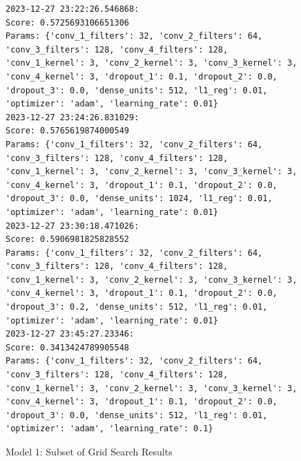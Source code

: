 

\setcounter{figure}{0}
\setcounter{table}{0} 
\begin{figure}[H]
\begin{verbatim}
2023-12-27 23:22:26.546868:
Score: 0.5725693106651306
Params: {'conv_1_filters': 32, 'conv_2_filters': 64, 'conv_3_filters': 128, 'conv_4_filters': 128, 'conv_1_kernel': 3, 'conv_2_kernel': 3, 'conv_3_kernel': 3, 'conv_4_kernel': 3, 'dropout_1': 0.1, 'dropout_2': 0.0, 'dropout_3': 0.0, 'dense_units': 512, 'l1_reg': 0.01, 'optimizer': 'adam', 'learning_rate': 0.01}
2023-12-27 23:24:26.831029:
Score: 0.5765619874000549
Params: {'conv_1_filters': 32, 'conv_2_filters': 64, 'conv_3_filters': 128, 'conv_4_filters': 128, 'conv_1_kernel': 3, 'conv_2_kernel': 3, 'conv_3_kernel': 3, 'conv_4_kernel': 3, 'dropout_1': 0.1, 'dropout_2': 0.0, 'dropout_3': 0.0, 'dense_units': 1024, 'l1_reg': 0.01, 'optimizer': 'adam', 'learning_rate': 0.01}
2023-12-27 23:30:18.471026:
Score: 0.5906981825828552
Params: {'conv_1_filters': 32, 'conv_2_filters': 64, 'conv_3_filters': 128, 'conv_4_filters': 128, 'conv_1_kernel': 3, 'conv_2_kernel': 3, 'conv_3_kernel': 3, 'conv_4_kernel': 3, 'dropout_1': 0.1, 'dropout_2': 0.0, 'dropout_3': 0.2, 'dense_units': 512, 'l1_reg': 0.01, 'optimizer': 'adam', 'learning_rate': 0.01}
2023-12-27 23:45:27.23346:
Score: 0.3413424789905548
Params: {'conv_1_filters': 32, 'conv_2_filters': 64, 'conv_3_filters': 128, 'conv_4_filters': 128, 'conv_1_kernel': 3, 'conv_2_kernel': 3, 'conv_3_kernel': 3, 'conv_4_kernel': 3, 'dropout_1': 0.1, 'dropout_2': 0.0, 'dropout_3': 0.0, 'dense_units': 512, 'l1_reg': 0.01, 'optimizer': 'adam', 'learning_rate': 0.1}
\end{verbatim}
\caption{Model 1: Subset of Grid Search Results}
\label{fig:model-1-grid-result}
\end{figure}

\newpage

